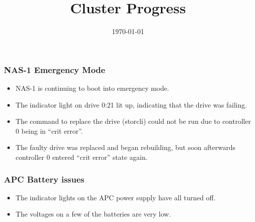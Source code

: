 \documentclass{beamer}
\title{Cluster Progress}
\date{\today}
\begin{document}

\begin{frame}
  \maketitle
\end{frame}



\begin{frame}
  \frametitle{NAS-1 Emergency Mode}

  \begin{itemize}    
  \item NAS-1 is continuing to boot into emergency mode.
  \item The indicator light on drive 0:21 lit up, indicating that the drive was failing.
  \item The command to replace the drive (storcli) could not be run due to controller 0 being in ``crit error''.
  \item The faulty drive was replaced and began rebuilding, but soon afterwards controller 0 entered ``crit error'' state again.
    
  \end{itemize}
  

\end{frame}
\begin{frame}
  \frametitle{APC Battery issues}

  \begin{itemize}
  \item The indicator lights on the APC power supply have all turned off.
  \item The voltages on a few of the batteries are very low.
    
  \end{itemize}
  
  \end{frame}
\end{document}
